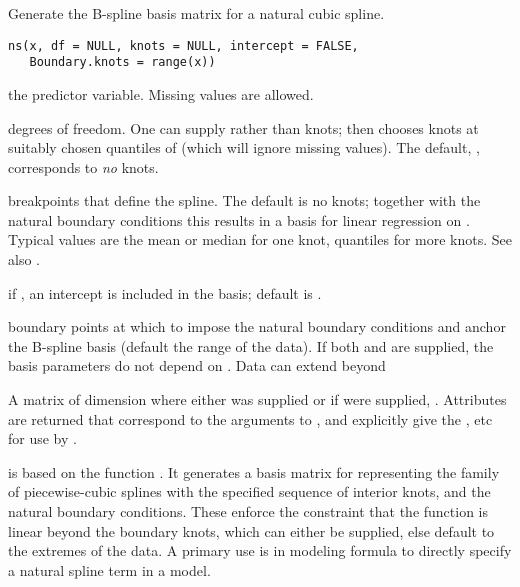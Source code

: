 %
\begin{Description}\relax
Generate the B-spline basis matrix for a natural cubic spline.
\end{Description}
%
\begin{Usage}
\begin{verbatim}
ns(x, df = NULL, knots = NULL, intercept = FALSE,
   Boundary.knots = range(x))
\end{verbatim}
\end{Usage}
%
\begin{Arguments}
\begin{ldescription}
\item[\code{x}] the predictor variable.  Missing values are allowed.
\item[\code{df}] degrees of freedom. One can supply  rather than
knots;  then chooses  knots at
suitably chosen quantiles of  (which will ignore missing
values).  The default, , corresponds to \emph{no} knots.
\item[\code{knots}] breakpoints that define the spline.  The default is no
knots; together with the natural boundary conditions this results in
a basis for linear regression on .  Typical values are the
mean or median for one knot, quantiles for more knots.  See also
.
\item[\code{intercept}] if , an intercept is included in the
basis; default is .
\item[\code{Boundary.knots}] boundary points at which to impose the natural
boundary conditions and anchor the B-spline basis (default the range
of the data).  If both  and  are
supplied, the basis parameters do not depend on . Data can
extend beyond 
\end{ldescription}
\end{Arguments}
%
\begin{Value}
A matrix of dimension  where either  was
supplied or if  were supplied,
.
Attributes are returned that correspond to the arguments to ,
and explicitly give the ,  etc for
use by .

 is based on the function .  It
generates a basis matrix for representing the family of
piecewise-cubic splines with the specified sequence of
interior knots, and the natural boundary conditions.  These enforce
the constraint that the function is linear beyond the boundary knots,
which can either be supplied, else default to the extremes of the
data.  A primary use is in modeling formula to directly specify a
natural spline term in a model.
\end{Value}
